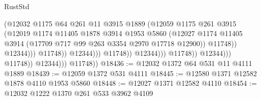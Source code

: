 \begin{lexlean}{RustStd}
\begin{coremodule}
                                                    (@12032
                                                      @1175
                                                      @64
                                                      @261
                                                      @11
                                                      @3915
                                                      @1889
                                                      (@12059
                                                        @1175
                                                        @261
                                                        @3915
                                                        (@12019
                                                          @1174
                                                          @11405
                                                          @1878
                                                          @3914
                                                          @1953
                                                          @5860
                                                          (@12027
                                                            @1174
                                                            @11405
                                                            @3914
                                                            (@17709
                                                              @717
                                                              @99
                                                              @263
                                                              @3354
                                                              @2970
                                                              @17718
                                                              @12900))
                                                          @11748))
                                                      @12344)))
                                                @11748))
                                            @12344)))
                                      @11748))
                                  @12344)))
                            @11748))
                        @12344)))
                  @11748))
              @12344)))
        @11748))
@18436 := @12032 @1372 @64 @531 @11 @4111 @1889
@18439 := @12059 @1372 @531 @4111
@18445 := @12580 @1371 @12582 @1878 @4110 @1953 @5860
@18448 := @12027 @1371 @12582 @4110
@18454 := @12032 @1222 @1370 @261 @533 @3962 @4109

\end{coremodule}
\end{lexlean}
